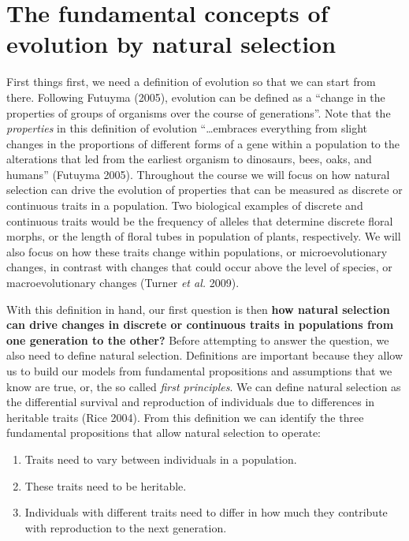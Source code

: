 \documentclass[
]{book}
\begin{document}
\hypertarget{the-fundamental-concepts-of-evolution-by-natural-selection}{%
\section{The fundamental concepts of evolution by natural selection}\label{the-fundamental-concepts-of-evolution-by-natural-selection}}

First things first, we need a definition of evolution so that we can start from there. Following Futuyma (2005), evolution can be defined as a ``change in the properties of groups of organisms over the course of generations''. Note that the \emph{properties} in this definition of evolution ``\ldots embraces everything from slight changes in the proportions of different forms of a gene within a population to the alterations that led from the earliest organism to dinosaurs, bees, oaks, and humans'' (Futuyma 2005). Throughout the course we will focus on how natural selection can drive the evolution of properties that can be measured as discrete or continuous traits in a population. Two biological examples of discrete and continuous traits would be the frequency of alleles that determine discrete floral morphs, or the length of floral tubes in population of plants, respectively. We will also focus on how these traits change within populations, or microevolutionary changes, in contrast with changes that could occur above the level of species, or macroevolutionary changes (Turner \emph{et al.} 2009).

With this definition in hand, our first question is then \textbf{how natural selection can drive changes in discrete or continuous traits in populations from one generation to the other?} Before attempting to answer the question, we also need to define natural selection. Definitions are important because they allow us to build our models from fundamental propositions and assumptions that we know are true, or, the so called \emph{first principles}. We can define natural selection as the differential survival and reproduction of individuals due to differences in heritable traits (Rice 2004). From this definition we can identify the three fundamental propositions that allow natural selection to operate:

\begin{enumerate}
\def\labelenumi{\arabic{enumi}.}
\item
  Traits need to vary between individuals in a population.
\item
  These traits need to be heritable.
\item
  Individuals with different traits need to differ in how much they contribute with reproduction to the next generation.
\end{enumerate}
\end{document}
